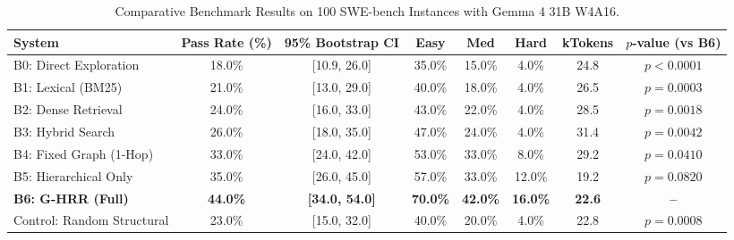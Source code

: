 \begin{table}[t]
\centering
\small
\caption{Comparative Benchmark Results on 100 SWE-bench Instances with Gemma 4 31B W4A16.}
\label{tab:main_results}
\begin{tabular}{lccccccc}
\toprule
\textbf{System} & \textbf{Pass Rate (\%)} & \textbf{95\% Bootstrap CI} & \textbf{Easy} & \textbf{Med} & \textbf{Hard} & \textbf{kTokens} & \textbf{$p$-value (vs B6)} \\
\midrule
B0: Direct Exploration & 18.0\% & [10.9, 26.0] & 35.0\% & 15.0\% & 4.0\% & 24.8 & $p < 0.0001$ \\
B1: Lexical (BM25) & 21.0\% & [13.0, 29.0] & 40.0\% & 18.0\% & 4.0\% & 26.5 & $p = 0.0003$ \\
B2: Dense Retrieval & 24.0\% & [16.0, 33.0] & 43.0\% & 22.0\% & 4.0\% & 28.5 & $p = 0.0018$ \\
B3: Hybrid Search & 26.0\% & [18.0, 35.0] & 47.0\% & 24.0\% & 4.0\% & 31.4 & $p = 0.0042$ \\
B4: Fixed Graph (1-Hop) & 33.0\% & [24.0, 42.0] & 53.0\% & 33.0\% & 8.0\% & 29.2 & $p = 0.0410$ \\
B5: Hierarchical Only & 35.0\% & [26.0, 45.0] & 57.0\% & 33.0\% & 12.0\% & 19.2 & $p = 0.0820$ \\
\textbf{B6: G-HRR (Full)} & \textbf{44.0\%} & \textbf{[34.0, 54.0]} & \textbf{70.0\%} & \textbf{42.0\%} & \textbf{16.0\%} & \textbf{22.6} & \textbf{--} \\
\midrule
Control: Random Structural & 23.0\% & [15.0, 32.0] & 40.0\% & 20.0\% & 4.0\% & 22.8 & $p = 0.0008$ \\
\bottomrule
\end{tabular}
\end{table}